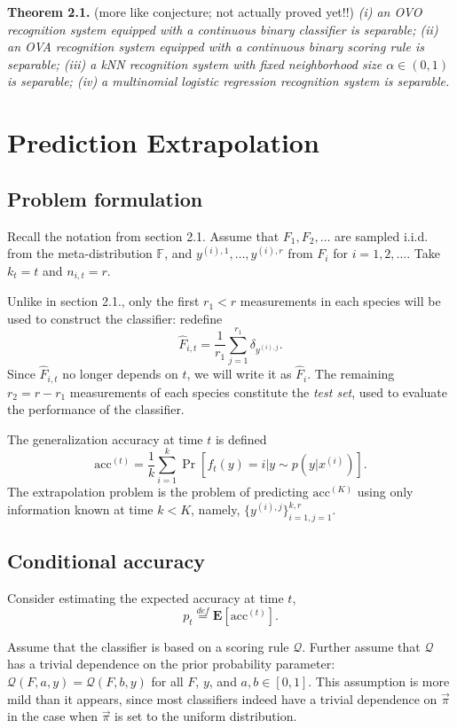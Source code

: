 \documentclass{article}
\newcommand{\E}{\textbf{E}}
\begin{document}
\textbf{Theorem 2.1.}{\color{red} (more like conjecture; not actually
  proved yet!!)}  \emph{(i) an OVO recognition system equipped with a
  continuous binary classifier is separable; (ii) an OVA recognition
  system equipped with a continuous binary scoring rule is separable;
  (iii) a kNN recognition system with fixed neighborhood size $\alpha
  \in (0, 1)$ is separable; (iv) a multinomial logistic regression
  recognition system is separable.}

\section{Prediction Extrapolation}

\subsection{Problem formulation}

Recall the notation from section 2.1. Assume that $F_1,F_2, \hdots$
are sampled i.i.d. from the meta-distribution $\mathbb{F}$, and
$y^{(i), 1}, \hdots, y^{(i), r}$ from $F_i$ for $i = 1, 2, \hdots$.
Take $k_t = t$ and $n_{i, t} = r$.

Unlike in section 2.1., only the first $r_1 < r$ measurements in each
species will be used to construct the classifier: redefine
\[
\hat{F}_{i, t} = \frac{1}{r_1} \sum_{j=1}^{r_1} \delta_{y^{(i), j}}.
\]
Since $\hat{F}_{i, t}$ no longer depends on $t$, we will write it as
$\hat{F}_i$.  The remaining $r_2 = r - r_1$ measurements of each
species constitute the \emph{test set}, used to evaluate the
performance of the classifier.

The generalization accuracy at time $t$ is defined
\[
\text{acc}^{(t)} = \frac{1}{k}\sum_{i=1}^k \Pr[f_t(y) = i|y \sim p(y|x^{(i)})].
\]
The extrapolation problem is the problem of predicting
$\text{acc}^{(K)}$ using only information known at time $k < K$,
namely, $\{y^{(i), j}\}_{i=1, j=1}^{k, r}$.

\subsection{Conditional accuracy}

Consider estimating the expected accuracy at time $t$, \[p_t
\stackrel{def}{=} \E[\text{acc}^{(t)}].\]

Assume that the classifier is based on a scoring rule $\mathcal{Q}$.
Further assume that $\mathcal{Q}$ has a trivial dependence on the
prior probability parameter: $\mathcal{Q}(F, a, y) = \mathcal{Q}(F, b,
y)$ for all $F$, $y$, and $a, b \in [0, 1]$.  This assumption is more
mild than it appears, since most classifiers indeed have a trivial
dependence on $\vec{\pi}$ in the case when $\vec{\pi}$ is set to the
uniform distribution.
\end{document}
